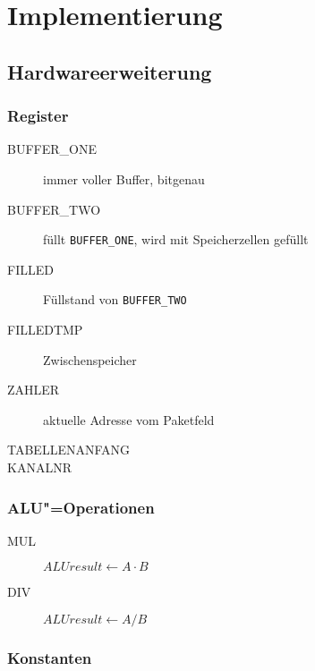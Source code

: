 \chapter{Implementierung}
\label{chapter:Dokumentation-Implementierung}

\section{Hardwareerweiterung}
\label{section:Dokumentation-Implementierung-Hardwareerweiterung}

\subsection{Register}
\label{subsection:Dokumentation-Implementierung-Hardwareerweiterung-Register}

\begin{description}
    \item[BUFFER\_ONE] immer voller Buffer, bitgenau
    \item[BUFFER\_TWO] füllt \texttt{BUFFER\_ONE}, wird mit Speicherzellen gefüllt
    \item[FILLED] Füllstand von \texttt{BUFFER\_TWO}
    \item[FILLEDTMP] Zwischenspeicher
    \item[ZAHLER] aktuelle Adresse vom Paketfeld
    \item[TABELLENANFANG]
    \item[KANALNR]
\end{description}

\subsection{ALU"=Operationen}
\label{subsection:Dokumentation-Implementierung-Hardwareerweiterung-AluOps}


\begin{description}
    \item[MUL] $ALUresult \gets A \cdot B$
    \item[DIV] $ALUresult \gets A / B$
\end{description}

\subsection{Konstanten}
\label{subsection:Dokumentation-Implementierung-Hardwareerweiterung-Konstanten}

